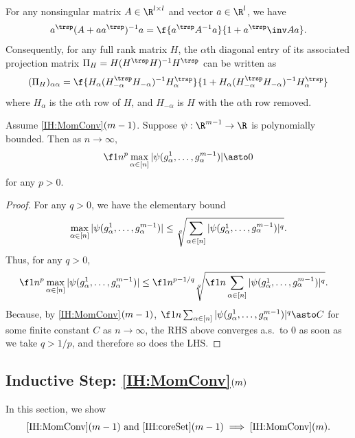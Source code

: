\documentclass[main.tex]{subfiles}
\begin{document}
\begin{fact}\label{fact:ShermanMorrison}
For any nonsingular matrix $A \in \R^{l \times l}$ and vector $a \in \R^l$,
we have
\[a^\trsp (A + aa^\trsp)^{-1} a = \f{a^\trsp A^{-1} a}{1 + a^\trsp \inv A a}.
\]
Consequently, for any full rank matrix $H$, the $\alpha$th diagonal entry of its associated projection matrix $\Pi_H = H (H^\trsp H)^{-1} H^\trsp$ can be written as
\[(\Pi_H)_{\alpha\alpha} = \f{H_\alpha (H_{-\alpha}^\trsp H_{-\alpha})^{-1} H_\alpha^\trsp}{1 + H_\alpha (H_{-\alpha}^\trsp H_{-\alpha})^{-1} H_\alpha^\trsp}
\]
where $H_\alpha$ is the $\alpha$th row of $H$, and $H_{-\alpha}$ is $H$ with the $\alpha$th row removed.
\end{fact}

\begin{lemma}\label{lemma:maxbound}
Assume \ref{IH:MomConv}$(m-1)$.
Suppose $\psi: \R^{\MM-1} \to \R$ is polynomially bounded.
Then as $n \to \infty,$
\[\f 1 {n^p} \max_{\alpha \in [n]} |\psi(g^1_\alpha, \ldots, g^{\MM-1}_\alpha)| \asto 0\]
for any $p > 0$.
\end{lemma}
\begin{proof}
For any $q > 0$, we have the elementary bound
\begin{equation*}
\max_{\alpha \in [n]} |\psi(g^1_\alpha, \ldots, g^{m-1}_\alpha)|
\le
\sqrt[q]{\sum_{\alpha \in [n]}
|\psi(g^1_\alpha, \ldots, g^{m-1}_\alpha)|^q}.
\end{equation*}
Thus, for any $q > 0$,
\begin{align*}
\f 1 {n^p} \max_{\alpha \in [n]} |\psi(g^1_\alpha, \ldots, g^{\MM-1}_\alpha)|
&\le
    \f 1 {n^{p-1/q}} 
    \sqrt[q]{\f 1 n
        \sum_{\alpha \in [n]}
        |\psi(g^1_\alpha, \ldots, g^{\MM-1}_\alpha)|^q}.
\end{align*}
Because, by \ref{IH:MomConv}$(m-1)$, $\f 1 n
        \sum_{\alpha \in [n]}
        |\psi(g^1_\alpha, \ldots, g^{\MM-1}_\alpha)|^q \asto C$ for some finite constant $C$ as $n \to \infty$,
the RHS above converges a.s.\ to 0 as soon as we take $q > 1/p$, and therefore so does the LHS.

\end{proof}

\subsection{Inductive Step: \ref{IH:MomConv}\texorpdfstring{$(m)$}{(m)}}
\label{sec:inductiveMoments}
In this section, we show
\begin{equation*}
\text{\ref{IH:MomConv}$(m-1)$ and \ref{IH:coreSet}$(m-1)$} \implies \text{\ref{IH:MomConv}}(m).
\end{equation*}
\end{document}

